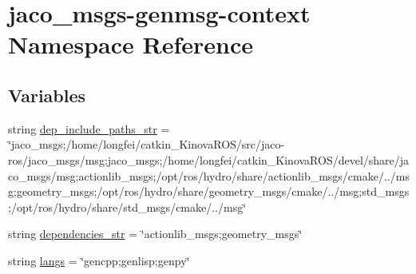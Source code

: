 \hypertarget{namespacejaco__msgs-genmsg-context}{}\section{jaco\+\_\+msgs-\/genmsg-\/context Namespace Reference}
\label{namespacejaco__msgs-genmsg-context}
\subsection*{Variables}
\begin{DoxyCompactItemize}
\item 
string \hyperlink{namespacejaco__msgs-genmsg-context_aa136d364766642fa2a562c6fdde58cf1}{dep\+\_\+include\+\_\+paths\+\_\+str} = \char`\"{}jaco\+\_\+msgs;/home/longfei/catkin\+\_\+\+Kinova\+R\+OS/src/jaco-\/ros/jaco\+\_\+msgs/msg;jaco\+\_\+msgs;/home/longfei/catkin\+\_\+\+Kinova\+R\+OS/devel/share/jaco\+\_\+msgs/msg;actionlib\+\_\+msgs;/opt/ros/hydro/share/actionlib\+\_\+msgs/cmake/../msg;geometry\+\_\+msgs;/opt/ros/hydro/share/geometry\+\_\+msgs/cmake/../msg;std\+\_\+msgs;/opt/ros/hydro/share/std\+\_\+msgs/cmake/../msg\char`\"{}
\item 
string \hyperlink{namespacejaco__msgs-genmsg-context_a13566f29eee7e302ea703274056230d0}{dependencies\+\_\+str} = \char`\"{}actionlib\+\_\+msgs;geometry\+\_\+msgs\char`\"{}
\item 
string \hyperlink{namespacejaco__msgs-genmsg-context_a3a7105aa3a2c51a1310d64f75f399733}{langs} = \char`\"{}gencpp;genlisp;genpy\char`\"{}
\item 

\end{DoxyCompactItemize}
